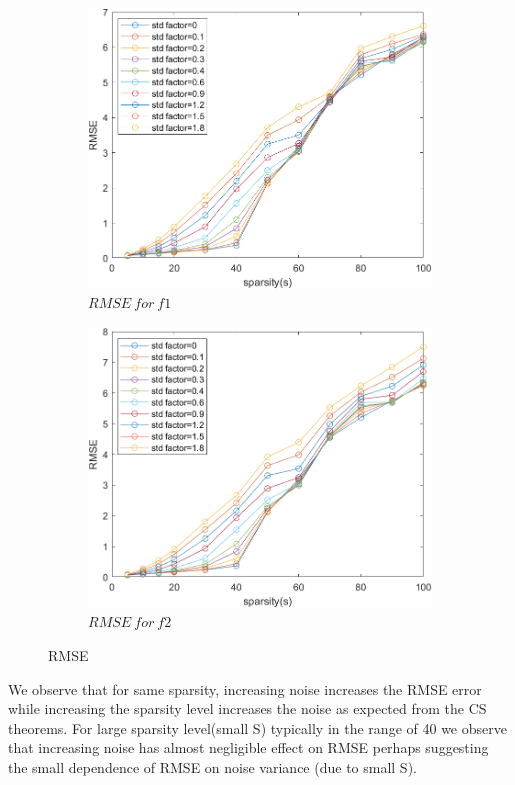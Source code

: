 \documentclass[12pt]{article}
\begin{document}
\begin{figure}[H]
	\centering
	\begin{subfigure}[b]{0.47\textwidth}
		\centering
		\includegraphics[width=\textwidth]{rmse_f1.png}
		\caption{$RMSE \ for \ f1$}
		\label{}
	\end{subfigure}
	\hfill
	\begin{subfigure}[b]{0.47\textwidth}
		\centering
		\includegraphics[width=\textwidth]{rmse_f2.png}
		\caption{$RMSE \ for \ f2$}
		\label{}
	\end{subfigure}
	\caption{RMSE}
	\label{fig:1}
\end{figure}
We observe that for same sparsity, increasing noise increases the RMSE error while increasing the sparsity level increases the noise as expected from the CS theorems. For large sparsity level(small S) typically in the range of 40 we observe that increasing noise has almost negligible effect on RMSE perhaps suggesting the small dependence of RMSE on noise variance (due to small S).
\end{document}
